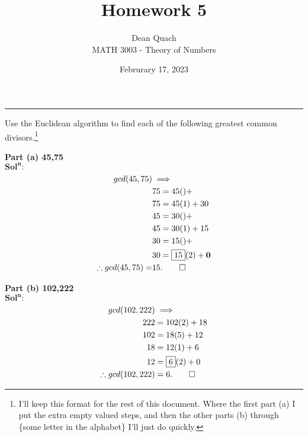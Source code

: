 \documentclass[12pt]{article}
\newenvironment{exercise}[2][Exercise]{\begin{trivlist}
\item[\hskip \labelsep {\bfseries #1}\hskip \labelsep {\bfseries #2.}]}{\end{trivlist}}
\begin{document}
 
 
 
\title{Homework 5}%
\author{Dean Quach\\ %
MATH 3003 - Theory of Numbers} %
\date{Februrary 17, 2023}
\maketitle

\hrule
\vspace{20pt}





\begin{exercise}{3.4.1} Use the Euclidean algorithm to find each of the following greatest common divisors.\footnote{I'll keep this format for the rest of this document. Where the first part (a) I put the extra empty valued steps, and then the other parts (b) through \{some letter in the alphabet\} I'll just do quickly.}
\end{exercise}


\noindent \textbf{Part (a) 45,75}\\
$\mathbf{Sol^n:}$
\begin{align*}
gcd(45,75)&\implies\\
&75=45()+\\
&75=45(1)+30\\
&45=30()+\\
&45=30(1)+15\\
&30=15()+\\
&30=\boxed{15}(2)+\mathbf{0}\\
\therefore gcd(45,75)=&15.\qed
\end{align*}


\noindent \textbf{Part (b) 102,222}\\
$\mathbf{Sol^n:}$
\begin{align*}
gcd(102,222)&\implies\\
222&=102(2)+18\\
102&=18(5)+12\\
18&=12(1)+6\\
12&=\boxed{6}(2)+0\\
\therefore gcd(102,222)&=6.\qed
\end{align*}
\end{document}
